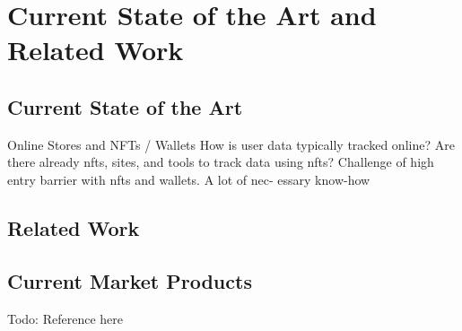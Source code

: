 \chapter{Current State of the Art and Related Work}
\label{ch:SOTA}

%
%
\section{Current State of the Art}
\label{sec:sota:stateOfTheArt}

Online Stores and NFTs / Wallets
How is user data typically tracked online? 
Are there already nfts, sites, and tools to track data using nfts? 
Challenge of high entry barrier with nfts and wallets. A lot of nec- essary know-how 


%
%
\section{Related Work}
\label{sec:sota:relatedWork}


%
%
\section{Current Market Products}
\label{sec:sota:products}

Todo: Reference \cite{walletConnect} here